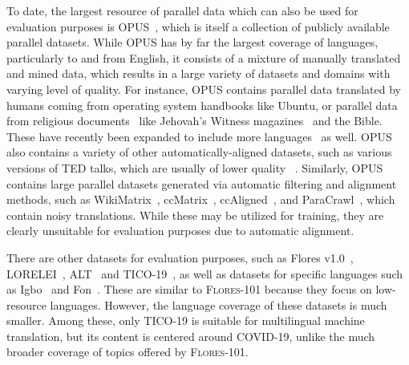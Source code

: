 To date, the largest resource of parallel data which can also be used for evaluation purposes is OPUS~\cite{tiedemann2012parallel}, which is itself a collection of publicly available parallel datasets. While OPUS has by far the largest coverage of languages, particularly to and from English, it consists of a mixture of manually translated and mined data, which results in a large variety of datasets and domains with varying level of quality. For instance, OPUS contains parallel data translated by humans coming from operating system handbooks like Ubuntu, or parallel data from religious documents~\cite{liu2021usefulness} like Jehovah's Witness magazines~\citep{agic-vulic-2019-jw300} and the Bible. These have recently been expanded to include more languages~\cite{nicolai2021expanding} as well. OPUS also contains a variety of other automatically-aligned datasets, such as various versions of TED talks, which are usually of lower quality ~\citep{Ye2018WordEmbeddings,zhang-etal-2020-improving,fan2020beyond}. Similarly, OPUS contains large parallel datasets generated via automatic filtering and alignment methods, such as WikiMatrix~\citep{schwenk-etal-2021-wikimatrix}, ccMatrix~\cite{schwenk2019ccmatrix}, ccAligned~\cite{elkishky2020ccaligned}, and ParaCrawl~\cite{paracrawl:2019:mt_summit}, which contain noisy translations. While these may be utilized for training, they are clearly unsuitable for evaluation purposes due to automatic alignment. 

There are other datasets for evaluation purposes, such as Flores v1.0~\citep{guzman-etal-2019-flores}, LORELEI~\citep{strassel-tracey-2016-lorelei},  ALT~\citep{thu-etal-2016-introducing,riza2016introduction,ding2016similar} and TICO-19~\citep{tico19}, as well as datasets for specific languages such as Igbo~\cite{ezeani2020igbo} and Fon~\citep{dossou2020ffr}. These are similar to \textsc{Flores-101} because they focus on low-resource languages. However, the language coverage of these datasets is much smaller. Among these, only TICO-19 is suitable for multilingual machine translation, but its content is centered around COVID-19, unlike the much broader coverage of topics offered by \textsc{Flores-101}.

